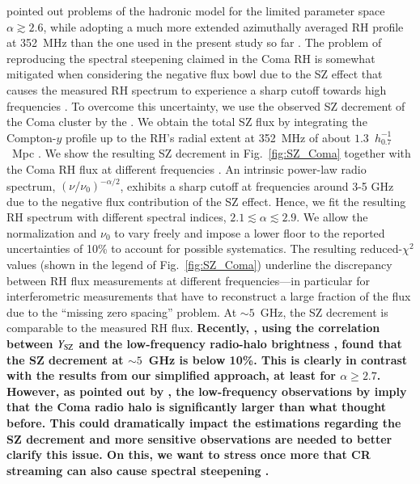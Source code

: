 \documentclass[useAMS,usenatbib]{mn2e}
\begin{document}
\citet{2012arXiv1207.3025B} pointed out problems of the hadronic model
for the limited parameter space $\alpha\gtrsim2.6$, while adopting a much
more extended azimuthally averaged RH profile at 352~MHz
\citep{2011MNRAS.412....2B} than the one used in the present study so far
\citep{1997A&A...321...55D}. The problem of reproducing the spectral steepening
claimed in the Coma RH is somewhat mitigated when considering the negative flux
bowl due to the SZ effect that causes the measured RH spectrum to experience a
sharp cutoff towards high frequencies \citep[][which both use X-ray inferred
pseudo-pressure profiles and assume an accretion shock radius to estimate the
Compton-$y$ parameter of Coma]{2002A&A...396L..17E, 2004A&A...413...17P}. To
overcome this uncertainty, we use the observed SZ decrement of the Coma cluster
by the \citet{2012arXiv1208.3611P}. We obtain the total SZ flux by integrating
the Compton-$y$ profile up to the RH's radial extent at 352~MHz of about
$1.3$~$h_{0.7}^{-1}$~Mpc \citep[][which provide the most sensitive observation
of the Coma RH to date]{2011MNRAS.412....2B}. We show the resulting SZ decrement
in Fig.~\ref{fig:SZ_Coma} together with the Coma RH flux at different
frequencies \citep{2003A&A...397...53T}. An intrinsic power-law radio spectrum,
$(\nu/\nu_{0})^{-\alpha/2}$, exhibits a sharp cutoff at frequencies around 3-5
GHz due to the negative flux contribution of the SZ effect. Hence, we fit the
resulting RH spectrum with different spectral indices, $2.1\lesssim
\alpha\lesssim2.9$. We allow the normalization and $\nu_{0}$ to vary freely and
impose a lower floor to the reported uncertainties of 10\% to account for
possible systematics. The resulting reduced-$\chi^{2}$ values (shown in the
legend of Fig.{\ }\ref{fig:SZ_Coma}) underline the discrepancy between RH flux
measurements at different frequencies---in particular for interferometric
measurements that have to reconstruct a large fraction of the flux due to the
``missing zero spacing'' problem. At $\sim5$~GHz, the SZ decrement is comparable
to the measured RH flux. {\bf Recently, \cite{2013arXiv1309.1820B}, using the
correlation between $Y_{{\mathrm{SZ}}}$ and the low-frequency radio-halo 
brightness \citep{2011MNRAS.412....2B,2012arXiv1208.3611P}, 
found that the SZ decrement at $\sim5$~GHz is below 10\%.
This is clearly in contrast with the results from our simplified approach,
at least for $\alpha \ge 2.7$. However, as pointed out by \cite{2013arXiv1309.1820B}, 
the low-frequency observations by \cite{2011MNRAS.412....2B} imply that the Coma
radio halo is significantly larger than what thought before. This could dramatically
impact the estimations regarding the SZ decrement and more sensitive
observations are needed to better clarify this issue. On this, we want to stress once more 
that CR streaming can also cause spectral steepening \citep{2013arXiv1303.4746W}.
} 
\end{document}
